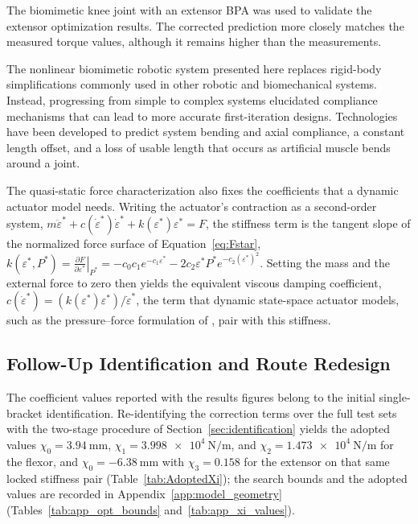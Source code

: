 The biomimetic knee joint with an extensor BPA was used to validate the extensor optimization results. The corrected prediction more closely matches the measured torque values, although it remains higher than the measurements.


The nonlinear biomimetic robotic system presented here replaces rigid-body simplifications commonly used in other robotic and biomechanical systems. Instead, progressing from simple to complex systems elucidated compliance mechanisms that can lead to more accurate first-iteration designs. Technologies have been developed to predict system bending and axial compliance, a constant length offset, and a loss of usable length that occurs as artificial muscle bends around a joint. 

The quasi-static force characterization also fixes the coefficients that a dynamic actuator model needs. Writing the actuator's contraction as a second-order system, $m\ddot \varepsilon^* + c (\dot \varepsilon^* ) \dot \varepsilon^* + k ( \varepsilon^* ) \varepsilon^* = F$, the stiffness term is the tangent slope of the normalized force surface of Equation~\eqref{eq:Fstar}, $k(\varepsilon^{*}, P^{*})
= \left.\frac{\partial F}{\partial \varepsilon^{*}}\right|_{P^{*}}
= -c_{0}c_{1}e^{-c_{1}\varepsilon^{*}}
  - 2c_{2}\varepsilon^{*}P^{*}e^{-c_{2}(\varepsilon^{*})^{2}}$. Setting the mass and the external force to zero then yields the equivalent viscous damping coefficient, $c (\dot \varepsilon^* ) = (k ( \varepsilon^* ) \varepsilon^*)/\dot \varepsilon^*$, the term that dynamic state-space actuator models, such as the pressure--force formulation of \citet{elzein_pressure_2025}, pair with this stiffness.

\subsection{Follow-Up Identification and Route Redesign}\label{sec:ongoing}

The coefficient values reported with the results figures belong to the initial single-bracket identification. Re-identifying the correction terms over the full test sets with the two-stage procedure of Section~\ref{sec:identification} yields the adopted values $\chi_{0} = \qty{+3.94}{\mm}$, $\chi_{1} = \qty{3.998e4}{\N\per\m}$, and $\chi_{2} = \qty{1.473e4}{\N\per\m}$ for the flexor, and $\chi_{0} = \qty{-6.38}{\mm}$ with $\chi_{3} = 0.158$ for the extensor on that same locked stiffness pair (Table~\ref{tab:AdoptedXi}); the search bounds and the adopted values are recorded in Appendix~\ref{app:model_geometry} (Tables~\ref{tab:app_opt_bounds} and~\ref{tab:app_xi_values}).

